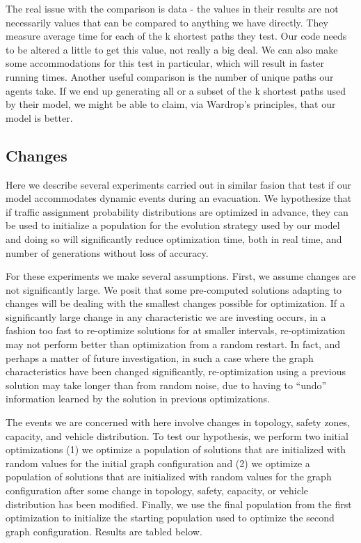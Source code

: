 The real issue with the comparison is data - the values in their results are not necessarily values that can be compared to anything we have directly. They measure average time for each of the k shortest paths they test. Our code needs to be altered a little to get this value, not really a big deal. We can also make some accommodations for this test in particular, which will result in faster running times. Another useful comparison is the number of unique paths our agents take. If we end up generating all or a subset of the k shortest paths used by their model, we might be able to claim, via Wardrop's principles, that our model is better.


\subsection{Changes}
Here we describe several experiments carried out in similar fasion that test if our model accommodates dynamic events during an evacuation. We hypothesize that if traffic assignment probability distributions are optimized in advance, they can be used to initialize a population for the evolution strategy used by our model and doing so will significantly reduce optimization time, both in real time, and number of generations without loss of accuracy.

For these experiments we make several assumptions. First, we assume changes are not significantly large. We posit that some pre-computed solutions adapting to changes will be dealing with the smallest changes possible for optimization. If a significantly large change in any characteristic we are investing occurs, in a fashion too fast to re-optimize solutions for at smaller intervals, re-optimization may not perform better than optimization from a random restart. In fact, and perhaps a matter of future investigation, in such a case where the graph characteristics have been changed significantly, re-optimization using a previous solution may take longer than from random noise, due to having to ``undo'' information learned by the solution in previous optimizations.

The events we are concerned with here involve changes in topology, safety zones, capacity, and vehicle distribution. To test our hypothesis, we perform two initial optimizations (1) we optimize a population of solutions that are initialized with random values for the initial graph configuration and (2) we optimize a population of solutions that are initialized with random values for the graph configuration after some change in topology, safety, capacity, or vehicle distribution has been modified. Finally, we use the final population from the first optimization to initialize the starting population used to optimize the second graph configuration. Results are tabled below.

